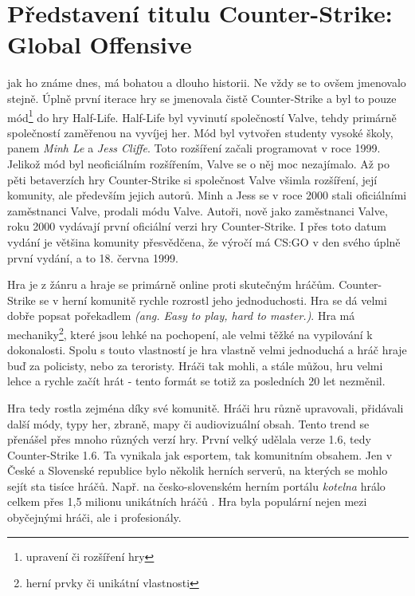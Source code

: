 \section{Představení titulu Counter-Strike: Global Offensive}
 jak ho známe dnes, má bohatou a dlouho historii. Ne vždy se to ovšem jmenovalo stejně. Úplně první iterace hry se jmenovala čistě Counter-Strike a byl to pouze mód\footnote{upravení či rozšíření hry} do
hry Half-Life. Half-Life byl vyvinutí společností Valve, tehdy primárně společností zaměřenou na vyvíjej her. Mód byl vytvořen studenty vysoké školy, panem \textit{Minh Le} a \textit{Jess Cliffe}. Toto rozšíření začali programovat
v roce 1999. Jelikož mód byl neoficiálním rozšířením, Valve se o něj moc nezajímalo. Až po pěti betaverzích hry Counter-Strike si společnost Valve všimla rozšíření, její komunity, ale především jejich autorů. Minh a Jess
se v roce 2000 stali oficiálními zaměstnanci Valve, prodali  módu Valve. Autoři, nově jako zaměstnanci Valve, roku 2000 vydávají první oficiální verzi hry Counter-Strike. I přes toto 
datum vydání je většina komunity přesvědčena, že výročí má \ac{CS:GO} v den svého úplně první vydání, a to 18. června 1999.

Hra je z žánru  a hraje se primárně online proti skutečným hráčům. Counter-Strike se v herní komunitě rychle rozrostl jeho jednoduchosti. Hra se dá velmi dobře popsat pořekadlem
\textit{ (ang. Easy to play, hard to master.)}. Hra má mechaniky\footnote{herní prvky či unikátní vlastnosti}, které jsou lehké na pochopení, ale velmi těžké na vypilování k dokonalosti.
Spolu s touto vlastností je hra vlastně velmi jednoduchá a hráč hraje buď za policisty, nebo za teroristy. Hráči tak mohli, a stále můžou, hru velmi lehce a rychle začít hrát - tento formát se totiž za posledních 20 let nezměnil. 

Hra tedy rostla zejména díky své komunitě. Hráči hru různě upravovali, přidávali další módy, typy her, zbraně, mapy či audiovizuální obsah. Tento trend se přenášel přes mnoho různých verzí hry. První velký  udělala
verze 1.6, tedy Counter-Strike 1.6. Ta vynikala jak esportem, tak komunitním obsahem. Jen v České a Slovenské republice bylo několik herních serverů, na kterých se mohlo sejít sta tisíce hráčů. Např. na česko-slovenském 
herním portálu \textit{kotelna} hrálo celkem přes 1,5 milionu unikátních hráčů \cite{csko2021}. Hra byla populární nejen mezi obyčejnými hráči, ale i profesionály.

